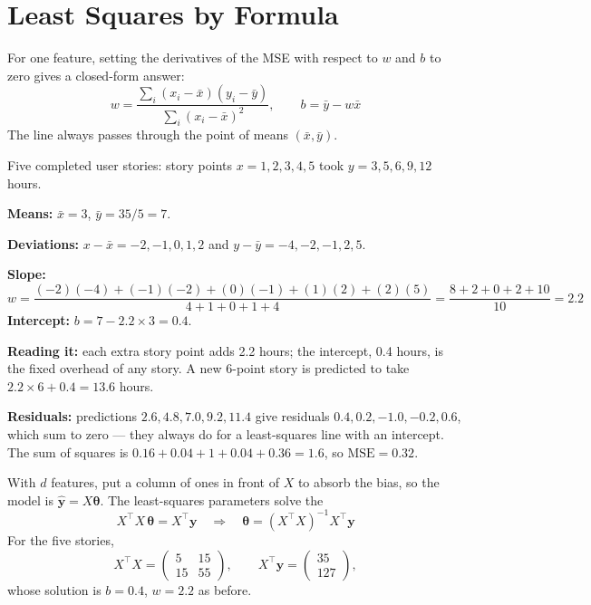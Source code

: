\section{Least Squares by Formula}

For one feature, setting the derivatives of the MSE with respect to $w$ and $b$
to zero gives a closed-form answer:
\[
w = \frac{\sum_i (x_i - \bar{x})(y_i - \bar{y})}{\sum_i (x_i - \bar{x})^2},
\qquad b = \bar{y} - w\bar{x}
\]
The line always passes through the point of means $(\bar{x}, \bar{y})$.

\begin{worked}
Five completed user stories: story points $x = 1, 2, 3, 4, 5$ took
$y = 3, 5, 6, 9, 12$ hours.

\smallskip
\textbf{Means:} $\bar{x} = 3$, $\bar{y} = 35/5 = 7$.

\textbf{Deviations:} $x - \bar{x} = -2, -1, 0, 1, 2$ and $y - \bar{y} = -4, -2, -1,
2, 5$.

\textbf{Slope:}
\[
w = \frac{(-2)(-4) + (-1)(-2) + (0)(-1) + (1)(2) + (2)(5)}{4 + 1 + 0 + 1 + 4}
  = \frac{8 + 2 + 0 + 2 + 10}{10} = \mathbf{2.2}
\]
\textbf{Intercept:} $b = 7 - 2.2 \times 3 = \mathbf{0.4}$.

\smallskip
\textbf{Reading it:} each extra story point adds 2.2 hours; the intercept, 0.4
hours, is the fixed overhead of any story. A new 6-point story is predicted to
take $2.2 \times 6 + 0.4 = 13.6$ hours.

\textbf{Residuals:} predictions $2.6, 4.8, 7.0, 9.2, 11.4$ give residuals
$0.4, 0.2, -1.0, -0.2, 0.6$, which sum to zero --- they always do for a
least-squares line with an intercept. The sum of squares is
$0.16 + 0.04 + 1 + 0.04 + 0.36 = 1.6$, so $\text{MSE} = 0.32$.
\end{worked}

\begin{definitionbox}
With $d$ features, put a column of ones in front of $X$ to absorb the bias, so the
model is $\hat{\mathbf{y}} = X\boldsymbol{\theta}$. The least-squares parameters
solve the 
\[
X^{\top}X\,\boldsymbol{\theta} = X^{\top}\mathbf{y}
\quad\Longrightarrow\quad
\boldsymbol{\theta} = (X^{\top}X)^{-1}X^{\top}\mathbf{y}
\]
For the five stories,
\[
X^{\top}X = \begin{pmatrix} 5 & 15 \\ 15 & 55\end{pmatrix}, \qquad
X^{\top}\mathbf{y} = \begin{pmatrix} 35 \\ 127 \end{pmatrix},
\]
whose solution is $b = 0.4$, $w = 2.2$ as before.
\end{definitionbox}

